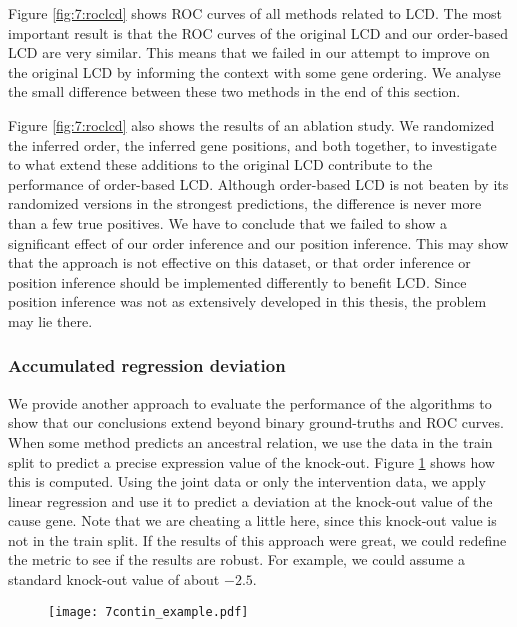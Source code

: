 Figure \ref{fig:7:roclcd} shows ROC curves of all methods related to LCD. The most important result is that the ROC curves of the original LCD and our order-based LCD are very similar. This means that we failed in our attempt to improve on the original LCD by informing the context with some gene ordering. We analyse the small difference between these two methods in the end of this section.

Figure \ref{fig:7:roclcd} also shows the results of an ablation study. We randomized the inferred order, the inferred gene positions, and both together, to investigate to what extend these additions to the original LCD contribute to the performance of order-based LCD. Although order-based LCD is not beaten by its randomized versions in the strongest predictions, the difference is never more than a few true positives. We have to conclude that we failed to show a significant effect of our order inference and our position inference. This may show that the approach is not effective on this dataset, or that order inference or position inference should be implemented differently to benefit LCD. Since position inference was not as extensively developed in this thesis, the problem may lie there.

\subsubsection{Accumulated regression deviation}

We provide another approach to evaluate the performance of the algorithms to show that our conclusions extend beyond binary ground-truths and ROC curves. When some method predicts an ancestral relation, we use the data in the train split to predict a precise expression value of the knock-out. Figure \ref{fig:7:contex} shows how this is computed. Using the joint data or only the intervention data, we apply linear regression and use it to predict a deviation at the knock-out value of the cause gene. Note that we are cheating a little here, since this knock-out value is not in the train split. If the results of this approach were great, we could redefine the metric to see if the results are robust. For example, we could assume a standard knock-out value of about $-2.5$.

\begin{figure}[h]
    \centering
    \texttt{[image: 7contin\_example.pdf]}
    \caption{}
    \label{fig:7:contex}
\end{figure}

